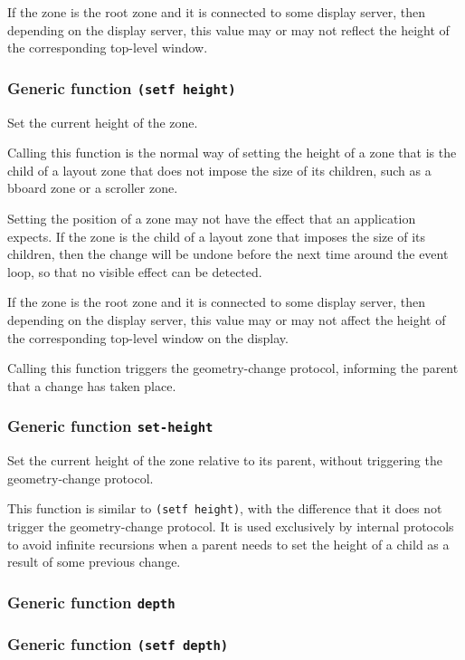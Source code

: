 \documentclass{report}
\begin{document}
If the zone is the root zone and it is connected to some display
server, then depending on the display server, this value may or
may not reflect the height of the corresponding top-level window.

\subsubsection{Generic function \texttt{(setf height)}}

Set the current height of the zone.

Calling this function is the normal way of setting the height of a
zone that is the child of a layout zone that does not impose the
size of its children, such as a bboard zone or a scroller zone.

Setting the position of a zone may not have the effect that an
application expects.  If the zone is the child of a layout zone
that imposes the size of its children, then the change will be
undone before the next time around the event loop, so that no
visible effect can be detected.

If the zone is the root zone and it is connected to some display
server, then depending on the display server, this value may or
may not affect the height of the corresponding top-level window on
the display.

Calling this function triggers the geometry-change protocol,
informing the parent that a change has taken place.

\subsubsection{Generic function \texttt{set-height}}

Set the current height of the zone relative to its parent, without
triggering the geometry-change protocol.

This function is similar to \texttt{(setf height)}, with the
difference that it does not trigger the geometry-change protocol.  It
is used exclusively by internal protocols to avoid infinite recursions
when a parent needs to set the height of a child as a result of some
previous change.

\subsubsection{Generic function \texttt{depth}}


\subsubsection{Generic function \texttt{(setf depth)}}
\end{document}
